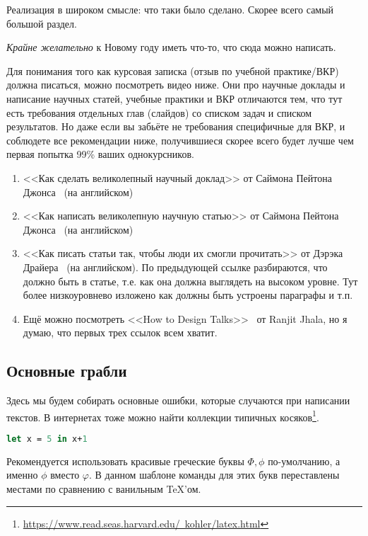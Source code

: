 
Реализация в широком смысле: что таки было сделано. Скорее всего самый большой раздел.

\emph{Крайне желательно} к Новому году иметь что-то, что сюда можно написать.

Для понимания того как курсовая записка (отзыв по учебной практике/ВКР) должна писаться, можно посмотреть видео ниже. Они про научные доклады и написание научных статей, учебные практики и ВКР отличаются тем, что тут есть требования отдельных глав (слайдов) со списком задач и списком результатов. Но даже если вы забьёте не требования специфичные для ВКР, и соблюдете все рекомендации ниже, получившиеся скорее всего будет лучше чем первая попытка 99\% ваших однокурсников.

\begin{enumerate}
\item <<Как сделать великолепный научный доклад>> от Саймона Пейтона Джонса~\cite{SPJGreatTalk} (на английском)
\item <<Как написать великолепную научную статью>> от Саймона Пейтона Джонса~\cite{SPJGreatPaper} (на английском)
\item <<Как писать статьи так, чтобы люди их смогли прочитать>> от Дэрэка Драйера~\cite{DreyerYoutube2020} (на английском). По предыдующей ссылке разбираются, что должно быть в статье, т.е. как она должна выглядеть на высоком уровне. Тут более низкоуровнево изложено как должны быть устроены параграфы и т.п.
\item Ещё можно посмотреть <<How to Design Talks>>~\cite{JhalaYoutube2020} от Ranjit Jhala, но я думаю, что первых трех ссылок всем хватит.
\end{enumerate}


\subsection{Основные грабли}
Здесь мы будем собирать основные ошибки, которые случаются при написании текстов. В интернетах тоже можно найти коллекции типичных косяков\footnote{\href{https://www.read.seas.harvard.edu/~kohler/latex.html}{https://www.read.seas.harvard.edu/~kohler/latex.html}}.


\begin{lstlisting}[caption=Название обязательно, language=Caml, frame=single]
let x = 5 in x+1
\end{lstlisting}

Рекомендуется использовать красивые греческие буквы $\Phi,\phi$ по-умол\-ча\-нию, а именно $\phi$ вместо $\varphi$. В данном шаблоне команды для этих букв переставлены местами по сравнению с ванильным \TeX'ом.


